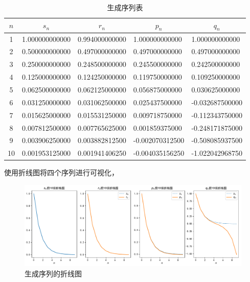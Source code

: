 \begin{table}[H]
	\centering
	\caption{生成序列表}
	\begin{tabular}{cllll}
		\hline
		$n$ & \multicolumn{1}{c}{$s_n$} & \multicolumn{1}{c}{$r_n$} & \multicolumn{1}{c}{$p_n$} & \multicolumn{1}{c}{$q_n$} \\ \hline
		1   & 1.000000000000            & 0.994000000000            & 1.000000000000            & 1.000000000000            \\
		2   & 0.500000000000            & 0.497000000000            & 0.497000000000            & 0.497000000000            \\
		3   & 0.250000000000            & 0.248500000000            & 0.245500000000            & 0.242500000000            \\
		4   & 0.125000000000            & 0.124250000000            & 0.119750000000            & 0.109250000000            \\
		5   & 0.062500000000            & 0.062125000000            & 0.056875000000            & 0.030625000000            \\
		6   & 0.031250000000            & 0.031062500000            & 0.025437500000            & -0.032687500000           \\
		7   & 0.015625000000            & 0.015531250000            & 0.009718750000            & -0.112343750000           \\
		8   & 0.007812500000            & 0.007765625000            & 0.001859375000            & -0.248171875000           \\
		9   & 0.003906250000            & 0.003882812500            & -0.002070312500           & -0.508085937500           \\
		10  & 0.001953125000            & 0.001941406250            & -0.004035156250           & -1.022042968750           \\ \hline
	\end{tabular}
\end{table}

使用折线图将四个序列进行可视化，

\begin{figure}[H]
	\centering
	\caption{生成序列的折线图}
	\includegraphics[width=\linewidth]{fig1.pdf}
\end{figure}

